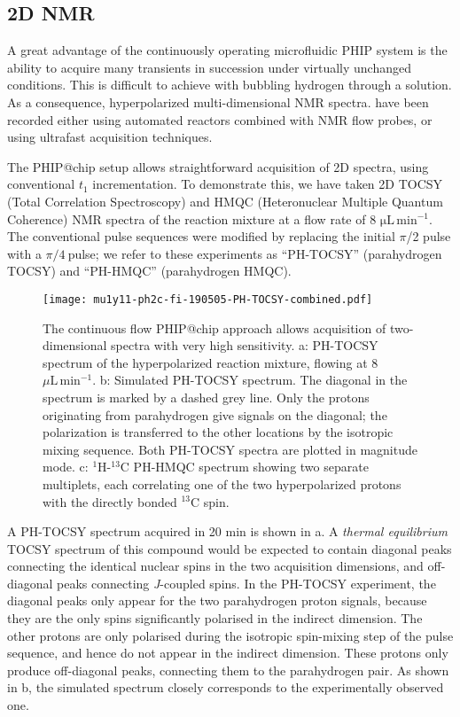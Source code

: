 \subsection{2D NMR}

A great advantage of the continuously operating microfluidic PHIP system is the
ability to acquire many transients in succession under virtually unchanged
conditions.
This is difficult to achieve with bubbling hydrogen through a solution.
As a consequence, hyperpolarized multi-dimensional NMR spectra\cite{Mishkovsky:2008cl,Giraudeau:2009fn,Roth:2010hk,Lloyd:2012cf,Eshuis:2015ce,Kiryutin:2019hy}. have been recorded
either using automated reactors combined with NMR flow probes,\cite{Lloyd:2012cf,Eshuis:2015ce}
or using ultrafast acquisition techniques\cite{Mishkovsky:2008cl,Giraudeau:2009fn,Kiryutin:2019hy}.

The PHIP@chip setup allows straightforward acquisition of 2D spectra, using
conventional $t_1$ incrementation.
To demonstrate this, we have taken 2D TOCSY (Total Correlation
Spectroscopy) and HMQC (Heteronuclear Multiple Quantum Coherence) NMR spectra
of the reaction mixture at a flow rate of 8 $\mathrm{\mu L\,min^{-1}}$.
The conventional
pulse sequences were modified by replacing the initial \(\pi\)/2 pulse with a
\(\pi/4\ \)pulse; we refer to these experiments as ``PH-TOCSY'' (parahydrogen TOCSY) and
``PH-HMQC'' (parahydrogen HMQC).

\begin{figure}
	\centering
	\texttt{[image: mu1y11-ph2c-fi-190505-PH-TOCSY-combined.pdf]}
	\caption{
		The continuous flow PHIP@chip approach allows acquisition of
		two-dimensional spectra with very high sensitivity.
    a: PH-TOCSY spectrum of the hyperpolarized reaction mixture,
		flowing at 8~$\mu\mathrm{L}\,\text{min}^{-1}$.
    b: Simulated PH-TOCSY spectrum. The diagonal in the spectrum is marked by a dashed grey
		line. Only the protons originating from parahydrogen give signals on
		the diagonal; the polarization is transferred to the other locations by
		the isotropic mixing sequence. Both PH-TOCSY spectra are plotted in
    magnitude mode.
    c: $^1$H-$^{13}$C PH-HMQC spectrum
		showing two separate multiplets, each correlating one of the two
		hyperpolarized protons with the directly bonded $^{13}$C spin.
}
	\label{fig:PH-TOCSY-HMQC}
\end{figure}

A PH-TOCSY spectrum acquired in 20 min is shown in a.
A \emph{thermal equilibrium} TOCSY spectrum of this compound would be
expected to
contain diagonal peaks connecting the identical nuclear spins in the two
acquisition dimensions, and off-diagonal peaks connecting \emph{J}-coupled
spins. In the PH-TOCSY experiment, the diagonal peaks only appear
for the two parahydrogen proton signals, because they are the only spins
significantly polarised in the indirect dimension. The other protons
are only polarised during the isotropic spin-mixing step of the pulse sequence,
and hence do not appear in the indirect dimension. These protons only produce
off-diagonal peaks, connecting them to the parahydrogen pair.
As shown in b, the simulated spectrum
closely corresponds to the experimentally observed one.

